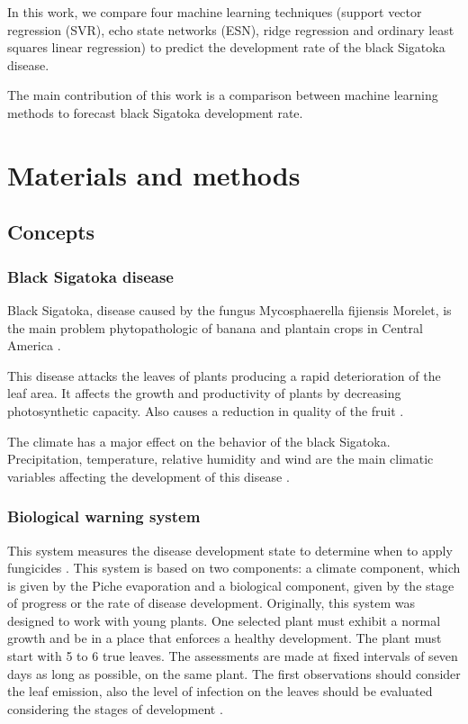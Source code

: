 \documentclass[review]{elsarticle}
\begin{document}
In this work, we compare four machine learning techniques (support vector
regression (SVR), echo state networks (ESN), ridge regression and
ordinary least squares linear regression) to predict the development rate of the black Sigatoka disease.

The main contribution of this work is a comparison between machine
learning methods to forecast black Sigatoka development rate. 


\section{Materials and methods}

\subsection{Concepts}
\subsubsection{Black Sigatoka disease}

Black Sigatoka, disease caused by the fungus Mycosphaerella fijiensis Morelet, is the main problem phytopathologic of banana and plantain crops in Central America \citep{MarinVargas1995}. 

This disease attacks the leaves of plants producing a rapid deterioration of the leaf area. It affects the growth and productivity of plants by decreasing photosynthetic capacity. Also causes a reduction in quality of the fruit \citep{MarinVargas1995}. 

The climate has a major effect on the behavior of the black Sigatoka. Precipitation, temperature, relative humidity and wind are the main climatic variables affecting the development of this disease \citep{MarinVargas1995}.

\subsubsection{Biological warning system}

This system measures the disease development state to determine when to
apply fungicides \citep{MarinVargas1995}.  This system is based on two
components: a climate component, which is given by the Piche
evaporation and a biological component, given by the stage of progress
or the rate of disease development. Originally, this system was
designed to work with young plants. One selected plant must exhibit a
normal growth and be in a place that enforces a healthy
development. The plant must start with 5 to 6 true leaves. The
assessments are made at fixed intervals of seven days as long as
possible, on the same plant. The first observations should consider
the leaf emission, also the level of infection on the leaves should be
evaluated considering the stages of development
\citep{MarinVargas1995}.
\end{document}
